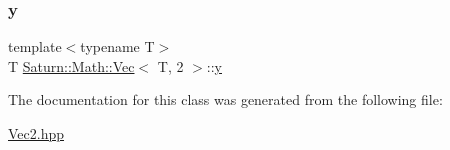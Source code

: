 \subsubsection{\texorpdfstring{y}{y}}
{\footnotesize\ttfamily template$<$typename T$>$ \\
T \mbox{\hyperlink{class_saturn_1_1_math_1_1_vec}{Saturn\+::\+Math\+::\+Vec}}$<$ T, 2 $>$\+::\mbox{\hyperlink{glad_8h_a12b33d8afd2f771e63a85ea45a440c64}{y}}}



The documentation for this class was generated from the following file\+:\begin{DoxyCompactItemize}
\item 
\mbox{\hyperlink{_vec2_8hpp}{Vec2.\+hpp}}\end{DoxyCompactItemize}
